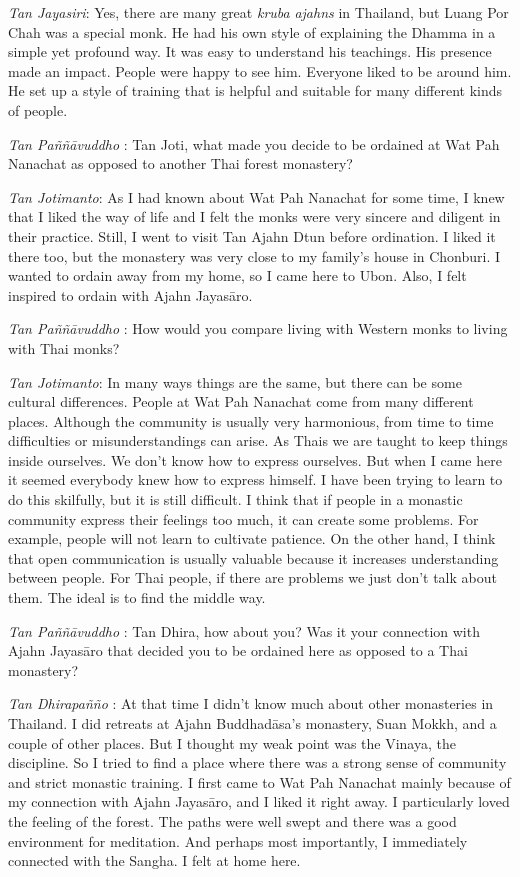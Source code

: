 \emph{Tan Jayasiri}: Yes, there are many great \emph{kruba}
\emph{ajahns} in Thailand, but Luang Por Chah was a special monk. He had
his own style of explaining the Dhamma in a simple yet profound way. It
was easy to understand his teachings. His presence made an impact.
People were happy to see him. Everyone liked to be around him. He set up
a style of training that is helpful and suitable for many different
kinds of people.

\emph{Tan Paññāvuddho} : Tan Joti, what made you decide to be ordained
at Wat Pah Nanachat as opposed to another Thai forest monastery?

\emph{Tan Jotimanto}: As I had known about Wat Pah Nanachat for some
time, I knew that I liked the way of life and I felt the monks were very
sincere and diligent in their practice. Still, I went to visit Tan Ajahn
Dtun before ordination. I liked it there too, but the monastery was very
close to my family's house in Chonburi. I wanted to ordain away from my
home, so I came here to Ubon. Also, I felt inspired to ordain with Ajahn
Jayasāro.

\emph{Tan Paññāvuddho} : How would you compare living with Western monks
to living with Thai monks?

\emph{Tan Jotimanto}: In many ways things are the same, but there can be
some cultural differences. People at Wat Pah Nanachat come from many
different places. Although the community is usually very harmonious,
from time to time difficulties or misunderstandings can arise. As Thais
we are taught to keep things inside ourselves. We don't know how to
express ourselves. But when I came here it seemed everybody knew how to
express himself. I have been trying to learn to do this skilfully, but
it is still difficult. I think that if people in a monastic community
express their feelings too much, it can create some problems. For
example, people will not learn to cultivate patience. On the other hand,
I think that open communication is usually valuable because it increases
understanding between people. For Thai people, if there are problems we
just don't talk about them. The ideal is to find the middle way.

\emph{Tan Paññāvuddho} : Tan Dhira, how about you? Was it your
connection with Ajahn Jayasāro that decided you to be ordained here as
opposed to a Thai monastery?

\emph{Tan Dhirapañño} : At that time I didn't know much about other
monasteries in Thailand. I did retreats at Ajahn Buddhadāsa's monastery,
Suan Mokkh, and a couple of other places. But I thought my weak point
was the Vinaya, the discipline. So I tried to find a place where there
was a strong sense of community and strict monastic training. I first
came to Wat Pah Nanachat mainly because of my connection with Ajahn
Jayasāro, and I liked it right away. I particularly loved the feeling of
the forest. The paths were well swept and there was a good environment
for meditation. And perhaps most importantly, I immediately connected
with the Sangha. I felt at home here.


